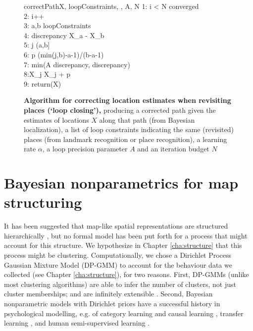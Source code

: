 \begin{figure}[h]
	\begin{pseudocode}{correctPath}{X, loopConstraints, \alpha, A, N}
		1: \WHILE i < N \AND \NOT converged \\
		2: \quad i++ \\
		3: \quad \FOREACH a,b \in loopConstraints \\
		4: \quad \quad discrepancy \GETS X_a - X_b \\
		5: \quad \quad \FOREACH j \in (a,b] \\
		6: \quad \quad \quad p \GETS (min(j,b)-a-1)/(b-a-1) \\
		7: \quad \quad \quad \beta \GETS min(\alpha A \cdot discrepancy, discrepancy) \\
		8:\quad\quad\quad X_j \GETS X_j + \beta p \\
		9: return(X)
	\end{pseudocode}
	\caption[Algorithm for correcting location estimates when revisiting places]{\textbf{Algorithm for correcting location estimates when revisiting places (`loop closing'),} producing a corrected path given the estimates of locations $X$ along that path (from Bayesian localization), a list of loop constraints indicating the same (revisited) places (from landmark recognition or place recognition), a learning rate $\alpha$, a loop precision parameter $A$ and an iteration budget $N$}
	\label{fig:sgdslam}
\end{figure}

\section{Bayesian nonparametrics for map structuring}

It has been suggested that map-like spatial representations are structured hierarchically \citep{hirtle1985evidence,mcnamara1989subjective,greenauer2010micro}, but no formal model has been put forth for a process that might account for this structure. We hypothesize in Chapter \ref{cha:structure} that this process might be clustering. Computationally, we chose a Dirichlet Process Gaussian Mixture Model (DP-GMM) to account for the behaviour data we collected (see Chapter \ref{cha:structure}), for two reasons. First, DP-GMMs (unlike most clustering algorithms) are able to infer the number of clusters, not just cluster memberships; and are infinitely extensible \citep{rasmussen1999infinite}. Second, Bayesian nonparametric models with Dirichlet priors have a successful history in psychological modelling, e.g. of category learning and causal learning \citep{tenenbaum2011grow}, transfer learning \citep{canini2010modeling}, and human semi-supervised learning \citep{gibson2013human}.

